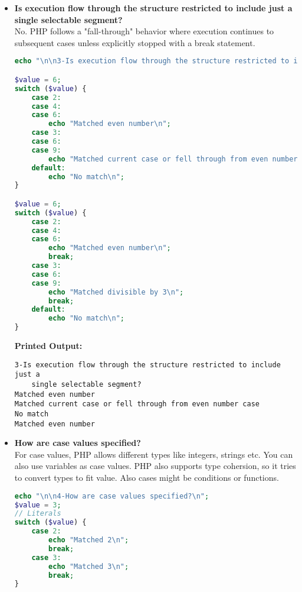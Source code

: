 \documentclass{article}
\begin{document}
\begin{itemize}
\begin{lstlisting}[language=PHP]
// Empty case
$value = 3;
switch ($value) {
    case 3:
        // fall through
    case 4:
        echo "This is case 3 or 4.\n";
        break;
    case 5:
        echo "This is case 5 with statement\n";
        break;
}
\end{lstlisting}
\textbf{Printed Output:} 
\begin{verbatim}
2-How are the selectable segments specified?
Case 10: First statement
Case 10: You can have multiple statements in a case block
This is case 3 or 4.
\end{verbatim}




\item \textbf{Is execution flow through the structure restricted to include just a single selectable segment?} \\
No. PHP follows a "fall-through" behavior where execution continues to subsequent cases unless explicitly stopped with a break statement.
\begin{lstlisting}[language=PHP]
echo "\n\n3-Is execution flow through the structure restricted to include just a single selectable segment?\n";

$value = 6;
switch ($value) {
    case 2:
    case 4:
    case 6:
        echo "Matched even number\n";
    case 3:
    case 6: 
    case 9:
        echo "Matched current case or fell through from even number case\n";
    default:
        echo "No match\n";
}

$value = 6;
switch ($value) {
    case 2:
    case 4:
    case 6:
        echo "Matched even number\n";
        break;
    case 3:
    case 6: 
    case 9:
        echo "Matched divisible by 3\n";
        break;
    default:
        echo "No match\n";
}
\end{lstlisting}
\textbf{Printed Output:} 
\begin{verbatim}
3-Is execution flow through the structure restricted to include just a 
    single selectable segment?
Matched even number
Matched current case or fell through from even number case
No match
Matched even number
\end{verbatim}

\item \textbf{How are case values specified?} \\
For case values, PHP allows different types like integers, strings etc. You can also use variables as case values. PHP also supports type cohersion, so it tries to convert types to fit value. Also cases might be conditions or functions.
\begin{lstlisting}[language=PHP]
echo "\n\n4-How are case values specified?\n";
$value = 3;
// Literals
switch ($value) {
    case 2:
        echo "Matched 2\n";
        break;
    case 3:
        echo "Matched 3\n";
        break;
}


\end{lstlisting}
\end{itemize}
\end{document}
